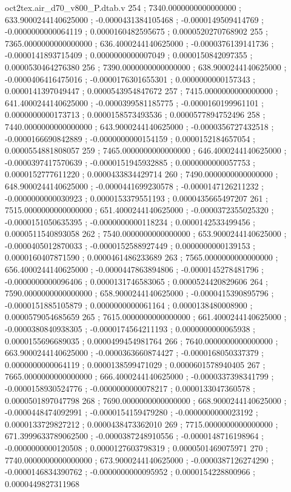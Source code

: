\begin{filecontents}[overwrite]{oct2tex.air_d70_v800_P.dtab.v}
254 ; 7340.0000000000000000 ; 633.9000244140625000 ; -0.0000431384105468 ; -0.0000149509414769 ; -0.0000000000064119 ; 0.0000160482595675 ; 0.0000520270768902
255 ; 7365.0000000000000000 ; 636.4000244140625000 ; -0.0000376139141736 ; -0.0000141893715409 ; 0.0000000000007049 ; 0.0000150842097355 ; 0.0000530464276380
256 ; 7390.0000000000000000 ; 638.9000244140625000 ; -0.0000406416475016 ; -0.0000176301655301 ; 0.0000000000157343 ; 0.0000141397049447 ; 0.0000543954847672
257 ; 7415.0000000000000000 ; 641.4000244140625000 ; -0.0000399581185775 ; -0.0000160199961101 ; 0.0000000000173713 ; 0.0000158573493536 ; 0.0000577894752496
258 ; 7440.0000000000000000 ; 643.9000244140625000 ; -0.0000356727432518 ; -0.0000166690842889 ; -0.0000000000154159 ; 0.0000152184657054 ; 0.0000554881808057
259 ; 7465.0000000000000000 ; 646.4000244140625000 ; -0.0000397417570639 ; -0.0000151945932885 ; 0.0000000000057753 ; 0.0000152777611220 ; 0.0000433834429714
260 ; 7490.0000000000000000 ; 648.9000244140625000 ; -0.0000441699230578 ; -0.0000147126211232 ; -0.0000000000030923 ; 0.0000153379551193 ; 0.0000435665497207
261 ; 7515.0000000000000000 ; 651.4000244140625000 ; -0.0000372355025320 ; -0.0000151050635395 ; -0.0000000000118234 ; 0.0000142533499456 ; 0.0000511540893058
262 ; 7540.0000000000000000 ; 653.9000244140625000 ; -0.0000405012870033 ; -0.0000152588927449 ; 0.0000000000139153 ; 0.0000160407871590 ; 0.0000461486233689
263 ; 7565.0000000000000000 ; 656.4000244140625000 ; -0.0000447863894806 ; -0.0000145278481796 ; -0.0000000000096406 ; 0.0000131746583065 ; 0.0000524420829606
264 ; 7590.0000000000000000 ; 658.9000244140625000 ; -0.0000415390895796 ; -0.0000151885105879 ; 0.0000000000061164 ; 0.0000138480008900 ; 0.0000579054685659
265 ; 7615.0000000000000000 ; 661.4000244140625000 ; -0.0000380840938305 ; -0.0000174564211193 ; 0.0000000000065938 ; 0.0000155696689035 ; 0.0000499454981764
266 ; 7640.0000000000000000 ; 663.9000244140625000 ; -0.0000363660874427 ; -0.0000168050337379 ; 0.0000000000064119 ; 0.0000138599471029 ; 0.0000601578940405
267 ; 7665.0000000000000000 ; 666.4000244140625000 ; -0.0000337398341799 ; -0.0000158930524776 ; -0.0000000000078217 ; 0.0000133047360578 ; 0.0000501897047798
268 ; 7690.0000000000000000 ; 668.9000244140625000 ; -0.0000448474092991 ; -0.0000154159479280 ; -0.0000000000023192 ; 0.0000133729827212 ; 0.0000438473362010
269 ; 7715.0000000000000000 ; 671.3999633789062500 ; -0.0000387248910556 ; -0.0000148716198964 ; -0.0000000000120508 ; 0.0000127603798319 ; 0.0000501469075971
270 ; 7740.0000000000000000 ; 673.9000244140625000 ; -0.0000387126274290 ; -0.0000146834390762 ; -0.0000000000095952 ; 0.0000154228800966 ; 0.0000449827311968

\end{filecontents}
